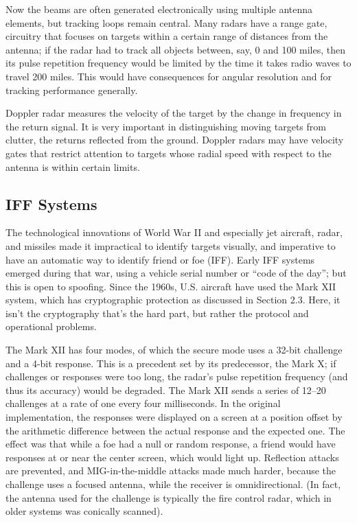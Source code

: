 \documentclass[10pt,journal,compsoc]{IEEEtran}
\begin{document}
Now the beams are often generated electronically using multiple antenna elements, but tracking loops
remain central. Many radars have a range gate, circuitry that focuses on targets within
a certain range of distances from the antenna; if the radar had to track all objects between,
say, 0 and 100 miles, then its pulse repetition frequency would be limited by the
time it takes radio waves to travel 200 miles. This would have consequences for angular
resolution and for tracking performance generally.

Doppler radar measures the velocity of the target by the change in frequency in the
return signal. It is very important in distinguishing moving targets from clutter, the
returns reflected from the ground. Doppler radars may have velocity gates that restrict
attention to targets whose radial speed with respect to the antenna is within certain
limits.

\subsection{IFF Systems}
The technological innovations of World War II and especially jet aircraft, radar, and
missiles made it impractical to identify targets visually, and imperative to have an
automatic way to identify friend or foe (IFF). Early IFF systems emerged during that
war, using a vehicle serial number or “code of the day”; but this is open to spoofing.
Since the 1960s, U.S. aircraft have used the Mark XII system, which has cryptographic
protection as discussed in Section 2.3. Here, it isn’t the cryptography that’s the hard
part, but rather the protocol and operational problems.

The Mark XII has four modes, of which the secure mode uses a 32-bit challenge and
a 4-bit response. This is a precedent set by its predecessor, the Mark X; if challenges or
responses were too long, the radar’s pulse repetition frequency (and thus its accuracy)
would be degraded. The Mark XII sends a series of 12–20 challenges at a rate of one
every four milliseconds. In the original implementation, the responses were displayed
on a screen at a position offset by the arithmetic difference between the actual response
and the expected one. The effect was that while a foe had a null or random response, a
friend would have responses at or near the center screen, which would light up. Reflection
attacks are prevented, and MIG-in-the-middle attacks made much harder, because the
challenge uses a focused antenna, while the receiver is omnidirectional. (In
fact, the antenna used for the challenge is typically the fire control radar, which in
older systems was conically scanned).
\end{document}
